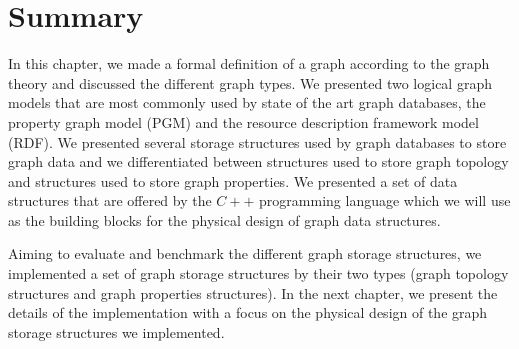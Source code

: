 {\section{Summary}
\label{sec:BackgroundSummary}

In this chapter, we made a formal definition of a graph according to the graph theory and discussed the different graph types. We presented two logical graph models that are most commonly used  by state of the art graph databases, the property graph model (PGM) and the resource description framework model (RDF). We presented several storage structures used by graph databases to store graph data and we differentiated between structures used to store graph topology and structures used to store graph properties. We presented a set of data structures that are offered by the $C++$ programming language which we will use as the building blocks for the physical design of graph data structures.

Aiming to evaluate and benchmark the different graph storage structures, we implemented a set of graph storage structures by their two types (graph topology structures and graph properties structures). In the next chapter, we present the details of the implementation with a focus on the physical design of the graph storage structures we implemented.

}